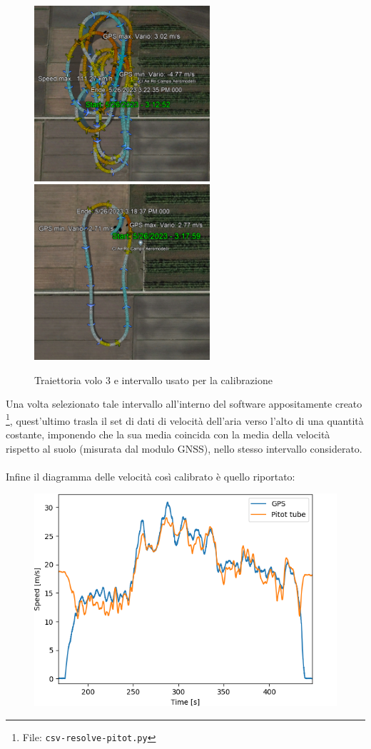 \documentclass[12pt]{article}
\begin{document}
\begin{figure}[!h]
	\centering
	\includegraphics[width=6.5cm]{img/traiettoria-3}
	\includegraphics[width=6.5cm]{img/traiettoria-isolata-3}
	\captionsetup{labelformat=empty}
	\caption{Traiettoria volo 3 e intervallo usato per la calibrazione}
\end{figure}

\noindent
Una volta selezionato tale intervallo all'interno del software appositamente creato \footnote{File: \texttt{csv-resolve-pitot.py}}, quest'ultimo trasla il set di dati di velocità dell'aria verso l'alto di una quantità costante, imponendo che la sua media coincida con la media della velocità rispetto al suolo (misurata dal modulo GNSS), nello stesso intervallo considerato.
\\\\
Infine il diagramma delle velocità così calibrato è quello riportato:

\begin{figure}[H]
	\centering
	\includegraphics[width=12cm]{img/pitot-calibrato-3}
\end{figure}
\end{document}
